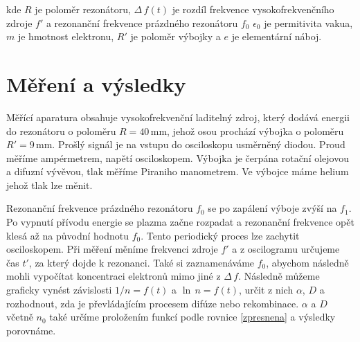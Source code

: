 \documentclass[a4paper,12pt]{article}
\begin{document}
kde $R$ je poloměr rezonátoru, $\Delta\,f(t)$ je rozdíl frekvence vysokofrekvenčního zdroje $f'$ a rezonanční frekvence prázdného rezonátoru $f_0$ $\epsilon_0$ je permitivita vakua, $m$ je hmotnost elektronu, $R'$ je poloměr výbojky a $e$ je elementární náboj.

\section{Měření a výsledky}
Měřící aparatura obsahuje vysokofrekvenční laditelný zdroj, který dodává energii do rezonátoru o poloměru $R = 40\,\si{\milli\meter}$, jehož osou prochází výbojka o poloměru $R' = 9\,\si{\milli\meter}$. Prošlý signál je na vstupu do osciloskopu usměrněný diodou. Proud měříme ampérmetrem, napětí osciloskopem. Výbojka je čerpána rotační olejovou a difuzní vývěvou, tlak měříme Piraniho manometrem. Ve výbojce máme helium jehož tlak lze měnit.

Rezonanční frekvence prázdného rezonátoru $f_0$ se po zapálení výboje zvýší na $f_1$. Po vypnutí přívodu energie se plazma začne rozpadat a rezonanční frekvence opět klesá až na původní hodnotu $f_0$. Tento periodický proces lze zachytit osciloskopem. Při měření měníme frekvenci zdroje $f'$ a z oscilogramu určujeme čas $t'$, za který dojde k rezonanci. Také si zaznamenáváme $f_0$, abychom následně mohli vypočítat koncentraci elektronů mimo jiné z $\Delta\,f$. Následně můžeme graficky vynést závislosti $1/n = f(t)$ a $\ln\,n = f(t)$, určit z nich $\alpha$, $D$ a rozhodnout, zda je převládajícím procesem difúze nebo rekombinace. $\alpha$ a $D$ včetně $n_0$ také určíme proložením funkcí podle rovnice \ref{zpresnena} a výsledky porovnáme.
\end{document}
